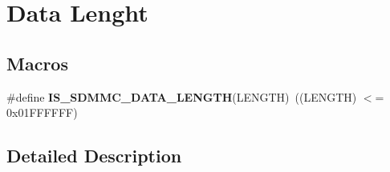 \hypertarget{group___s_d_m_m_c___l_l___data___length}{}\section{Data Lenght}
\label{group___s_d_m_m_c___l_l___data___length}
\subsection*{Macros}
\begin{DoxyCompactItemize}
\item 
\mbox{\label{group___s_d_m_m_c___l_l___data___length_gac42ce80adbad2730a35dbd5317b5e173}} 
\#define {\bfseries I\+S\+\_\+\+S\+D\+M\+M\+C\+\_\+\+D\+A\+T\+A\+\_\+\+L\+E\+N\+G\+TH}(L\+E\+N\+G\+TH)~((L\+E\+N\+G\+TH) $<$= 0x01\+F\+F\+F\+F\+F\+F)
\end{DoxyCompactItemize}


\subsection{Detailed Description}
